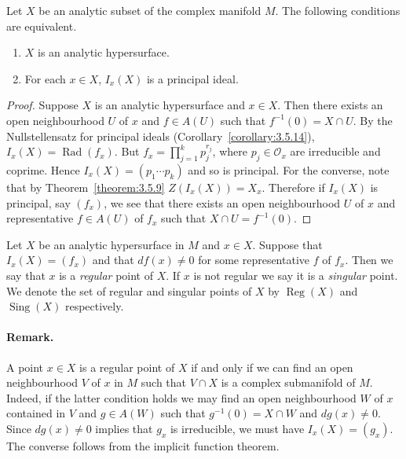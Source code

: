  Let $X$ be an analytic subset of the complex manifold $M$. The following conditions are equivalent.
\begin{enumerate}
\item $X$ is an analytic hypersurface.
\item For each $x\in X$, $I_x(X)$ is a principal ideal.
\end{enumerate}
\begin{proof}
Suppose $X$ is an analytic hypersurface and $x\in X$. Then there exists an open neighbourhood $U$ of $x$ and $f\in A(U)$ such that $f^{-1}(0)=X\cap U$. By the Nullstellensatz for principal ideals (Corollary~\ref{corollary:3.5.14}),
$I_x(X)=\operatorname{Rad}(f_x)$. But $f_x=\prod_{j=1}^k p_j^{r_j}$, where $p_j\in\mathcal O_x$ are irreducible and coprime. Hence $I_x(X)=(p_1\cdots p_k)$ and so is principal. For the converse, note that by Theorem~\ref{theorem:3.5.9} $Z(I_x(X))=X_x$. Therefore if $I_x(X)$ is principal, say $(f_x)$, we see that there exists an open neighbourhood $U$ of $x$ and representative $f\in A(U)$ of $f_x$ such that $X\cap U=f^{-1}(0)$.
\end{proof}

 Let $X$ be an analytic hypersurface in $M$ and $x\in X$. Suppose that $I_x(X)=(f_x)$ and that $df(x)\neq0$ for some representative $f$ of $f_x$. Then we say that $x$ is a \emph{regular} point of $X$. If $x$ is not regular we say it is a \emph{singular} point. We denote the set of regular and singular points of $X$ by $\operatorname{Reg}(X)$ and $\operatorname{Sing}(X)$ respectively.

\paragraph*{Remark.} A point $x\in X$ is a regular point of $X$ if and only if we can find an open neighbourhood $V$ of $x$ in $M$ such that $V\cap X$ is a complex submanifold of $M$. Indeed, if the latter condition holds we may find an open neighbourhood $W$ of $x$ contained in $V$ and $g\in A(W)$ such that $g^{-1}(0)=X\cap W$ and $dg(x)\neq0$. Since $dg(x)\neq0$ implies that $g_x$ is irreducible, we must have $I_x(X)=(g_x)$. The converse follows from the implicit function theorem.

